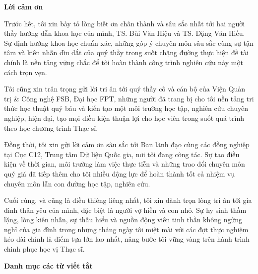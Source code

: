 \documentclass[12pt,a4paper]{report}
\begin{document}
\newpage
{}
\begin{center}
    {\Large\textbf{Lời cảm ơn}}
\end{center}
\vspace{0.5cm}

Trước hết, tôi xin bày tỏ lòng biết ơn chân thành và sâu sắc nhất tới hai người thầy hướng dẫn khoa học của mình, TS. Bùi Văn Hiệu và TS. Đặng Văn Hiếu. Sự định hướng khoa học chuẩn xác, những góp ý chuyên môn sâu sắc cùng sự tận tâm và kiên nhẫn dìu dắt của quý thầy trong suốt chặng đường thực hiện đề tài chính là nền tảng vững chắc để tôi hoàn thành công trình nghiên cứu này một cách trọn vẹn.

Tôi cũng xin trân trọng gửi lời tri ân tới quý thầy cô và cán bộ của Viện Quản trị \& Công nghệ FSB, Đại học FPT, những người đã trang bị cho tôi nền tảng tri thức học thuật quý báu và kiến tạo một môi trường học tập, nghiên cứu chuyên nghiệp, hiện đại, tạo mọi điều kiện thuận lợi cho học viên trong suốt quá trình theo học chương trình Thạc sĩ.

Đồng thời, tôi xin gửi lời cảm ơn sâu sắc tới Ban lãnh đạo cùng các đồng nghiệp tại Cục C12, Trung tâm Dữ liệu Quốc gia, nơi tôi đang công tác. Sự tạo điều kiện về thời gian, môi trường làm việc thực tiễn và những trao đổi chuyên môn quý giá đã tiếp thêm cho tôi nhiều động lực để hoàn thành tốt cả nhiệm vụ chuyên môn lẫn con đường học tập, nghiên cứu.

Cuối cùng, và cũng là điều thiêng liêng nhất, tôi xin dành trọn lòng tri ân tới gia đình thân yêu của mình, đặc biệt là người vợ hiền và con nhỏ. Sự hy sinh thầm lặng, lòng kiên nhẫn, sự thấu hiểu và nguồn động viên tinh thần không ngừng nghỉ của gia đình trong những tháng ngày tôi miệt mài với các đợt thực nghiệm kéo dài chính là điểm tựa lớn lao nhất, nâng bước tôi vững vàng trên hành trình chinh phục học vị Thạc sĩ.


\newpage
\listoffigures
\newpage
\listoftables
\newpage
{}
\begin{center}
    {\Large\textbf{Danh mục các từ viết tắt}}
\end{center}
\vspace{0.5cm}
\end{document}
